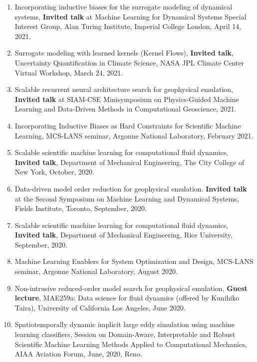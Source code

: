 \documentclass[letterpaper]{article}
\begin{document}
\begin{enumerate}
\item Incorporating inductive biases for the surrogate modeling of dynamical systems, \textbf{Invited talk} at Machine Learning for Dynamical Systems Special Interest Group, Alan Turing Institute, Imperial College London, April 14, 2021.

\item Surrogate modeling with learned kernels (Kernel Flows), \textbf{Invited talk}, Uncertainty Quantification in Climate Science, NASA JPL Climate Center Virtual Workshop, March 24, 2021.

\item Scalable recurrent neural architecture search for geophysical emulation, \textbf{Invited talk} at SIAM-CSE Minisymposium on Physics-Guided Machine Learning and Data-Driven Methods in Computational Geoscience, 2021.

\item Incorporating Inductive Biases as Hard Constraints for Scientific Machine Learning, MCS-LANS seminar, Argonne National Laboratory, February 2021.

\item Scalable scientific machine learning for computational fluid dynamics, \textbf{Invited talk}, Department of Mechanical Engineering, The City College of New York, October, 2020.

\item Data-driven model order reduction for geophysical emulation. \textbf{Invited talk} at the Second Symposium on Machine Learning and Dynamical Systems, Fields Institute, Toronto, September, 2020.

\item Scalable scientific machine learning for computational fluid dynamics, \textbf{Invited talk}, Department of Mechanical Engineering, Rice University, September, 2020.

\item Machine Learning Enablers for System Optimization and Design, MCS-LANS seminar, Argonne National Laboratory, August 2020.

\item Non-intrusive reduced-order model search for geophysical emulation, \textbf{Guest lecture}, MAE259a: Data science for fluid dynamics (offered by Kunihiko Taira), University of California Los Angeles, June 2020.

\item Spatiotemporally dynamic implicit large eddy simulation using machine learning classifiers, Session on Domain-Aware, Interpretable and Robust Scientific Machine Learning Methods Applied to Computational Mechanics, AIAA Aviation Forum, June, 2020, Reno. 


\end{enumerate}
\end{document}
